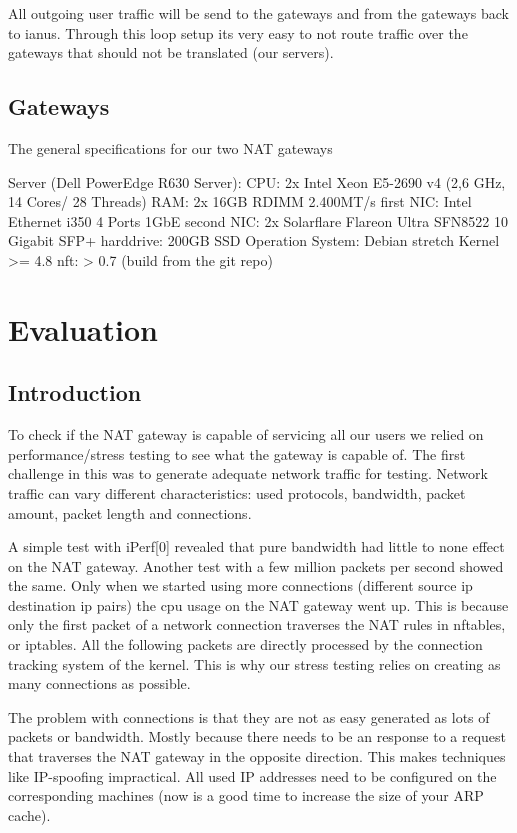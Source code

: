 All outgoing user traffic will be send to the gateways and from the
gateways back to ianus. Through this loop setup its very easy to not
route traffic over the gateways that should not be translated (our
servers).

\subsection{Gateways}\label{gateways}

The general specifications for our two NAT gateways

Server (Dell PowerEdge R630 Server): CPU: 2x Intel Xeon E5-2690 v4 (2,6
GHz, 14 Cores/ 28 Threads) RAM: 2x 16GB RDIMM 2.400MT/s first NIC: Intel
Ethernet i350 4 Ports 1GbE second NIC: 2x Solarflare Flareon Ultra
SFN8522 10 Gigabit SFP+ harddrive: 200GB SSD Operation System: Debian
stretch Kernel \textgreater{}= 4.8 nft: \textgreater{} 0.7 (build from
the git repo)

\section{Evaluation}\label{evaluation}

\subsection{Introduction}\label{introduction-1}

To check if the NAT gateway is capable of servicing all our users we
relied on performance/stress testing to see what the gateway is capable
of. The first challenge in this was to generate adequate network traffic
for testing. Network traffic can vary different characteristics: used
protocols, bandwidth, packet amount, packet length and connections.

A simple test with iPerf{[}0{]} revealed that pure bandwidth had little
to none effect on the NAT gateway. Another test with a few million
packets per second showed the same. Only when we started using more
connections (different source ip destination ip pairs) the cpu usage on
the NAT gateway went up. This is because only the first packet of a
network connection traverses the NAT rules in nftables, or iptables. All
the following packets are directly processed by the connection tracking
system of the kernel. This is why our stress testing relies on creating
as many connections as possible.

The problem with connections is that they are not as easy generated as
lots of packets or bandwidth. Mostly because there needs to be an
response to a request that traverses the NAT gateway in the opposite
direction. This makes techniques like IP-spoofing impractical. All used
IP addresses need to be configured on the corresponding machines (now is
a good time to increase the size of your ARP cache).

